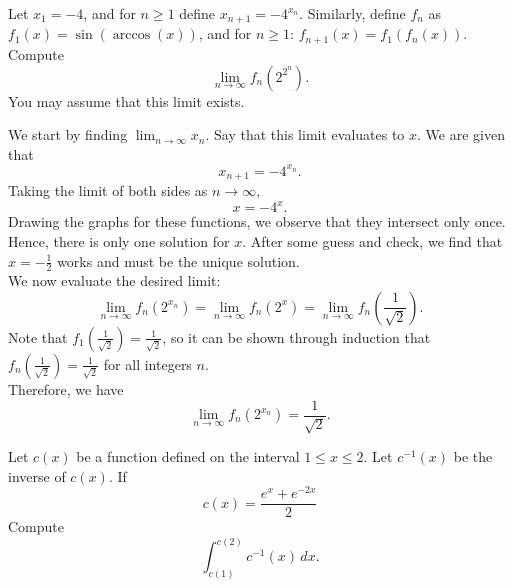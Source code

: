 \documentclass[12pt]{article}
\newcounter{problem}
\begin{document}
\vspace{1cm}

\begin{problem}[R][6][BMT 2021/6]
   Let \(x_1 = -4\), and for \(n \geq 1\) define \(x_{n+1} = -4^{x_n}\). Similarly, define $f_n$ as \(f_1(x) = \sin(\arccos(x))\), and for \(n \geq 1\): \(f_{n+1}(x) = f_1(f_n(x))\). Compute 
    \[
    \lim_{n \to \infty} f_n(2^{2^n}).
    \]
    You may assume that this limit exists.
\end{problem}

\begin{solution}
   We start by finding \(\lim_{n \to \infty} x_n\). Say that this limit evaluates to \(x\). We are given that
\[
x_{n+1} = -4^{x_n}.
\]
Taking the limit of both sides as \(n \to \infty\),
\[
x = -4^x.
\]
Drawing the graphs for these functions, we observe that they intersect only once. Hence, there is only one solution for \(x\). After some guess and check, we find that \(x = -\frac{1}{2}\) works and must be the unique solution. \\[10pt]
We now evaluate the desired limit:
\[
\lim_{n \to \infty} f_n(2^{x_n}) = \lim_{n \to \infty} f_n(2^x) = \lim_{n \to \infty} f_n\left(\frac{1}{\sqrt{2}}\right).
\]
Note that \(f_1\left(\frac{1}{\sqrt{2}}\right) = \frac{1}{\sqrt{2}}\), so it can be shown through induction that \(f_n\left(\frac{1}{\sqrt{2}}\right) = \frac{1}{\sqrt{2}}\) for all integers \(n\). \\[10pt]
Therefore, we have
\[
\lim_{n \to \infty} f_n(2^{x_n}) = \boxed{\frac{1}{\sqrt{2}}}.
\]
\end{solution}

\vspace{1cm}

\begin{problem}[R][5][BMT 2021/7]
   Let \( c(x) \) be a function defined on the interval \(1 \leq x \leq 2\). Let \(c^{-1}(x)\) be the inverse of \(c(x)\). If
   \[c(x) = \frac{e^x + e^{-2x}}{2}\]
   Compute
   \[ \int_{c(1)}^{c(2)} c^{-1}(x) \, dx. \]
\end{problem}

\vspace{-1.2cm}
\end{document}
